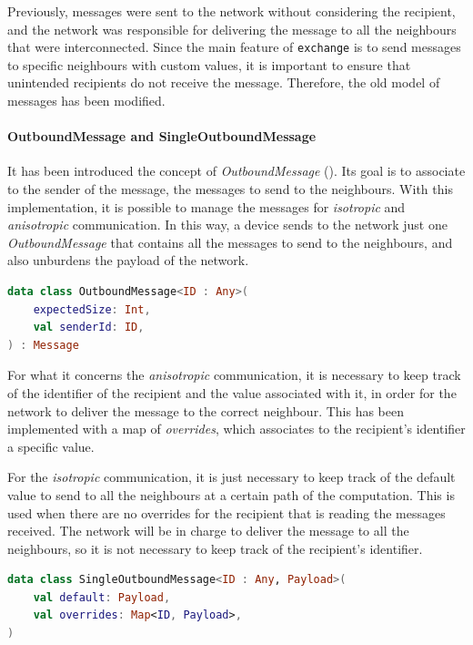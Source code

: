 Previously, messages were sent to the network without considering the recipient, and the network was responsible for
delivering the message to all the neighbours that were interconnected.
Since the main feature of \texttt{exchange} is to send messages to specific neighbours with custom values, it is important
to ensure that unintended recipients do not receive the message.
Therefore, the old model of messages has been modified.

\paragraph{OutboundMessage and SingleOutboundMessage}
It has been introduced the concept of \emph{OutboundMessage} ().
Its goal is to associate to the sender of the message, the messages to send to the neighbours.
With this implementation, it is possible to manage the messages for \emph{isotropic} and \emph{anisotropic} communication.
In this way, a device sends to the network just one \emph{OutboundMessage} that contains all the messages to send to the neighbours,
and also unburdens the payload of the network.

\begin{lstlisting}[language=kt,label={lst:outbound}, caption={Outbound message data class.}]
data class OutboundMessage<ID : Any>(
    expectedSize: Int,
    val senderId: ID,
) : Message
\end{lstlisting}

For what it concerns the \emph{anisotropic} communication, it is necessary to keep track of the identifier of the recipient
and the value associated with it, in order for the network to deliver the message to the correct neighbour.
This has been implemented with a map of \emph{overrides}, which associates to the recipient's identifier a specific value.

For the \emph{isotropic} communication, it is just necessary to keep track of the default value to send to all the neighbours
at a certain path of the computation.
This is used when there are no overrides for the recipient that is reading the messages received.
The network will be in charge to deliver the message to all the neighbours, so it is not necessary to keep track of the recipient's identifier.

\begin{lstlisting}[language=kt,label={lst:single}, caption={Single outbound message data class.}]
data class SingleOutboundMessage<ID : Any, Payload>(
    val default: Payload,
    val overrides: Map<ID, Payload>,
)
\end{lstlisting}

